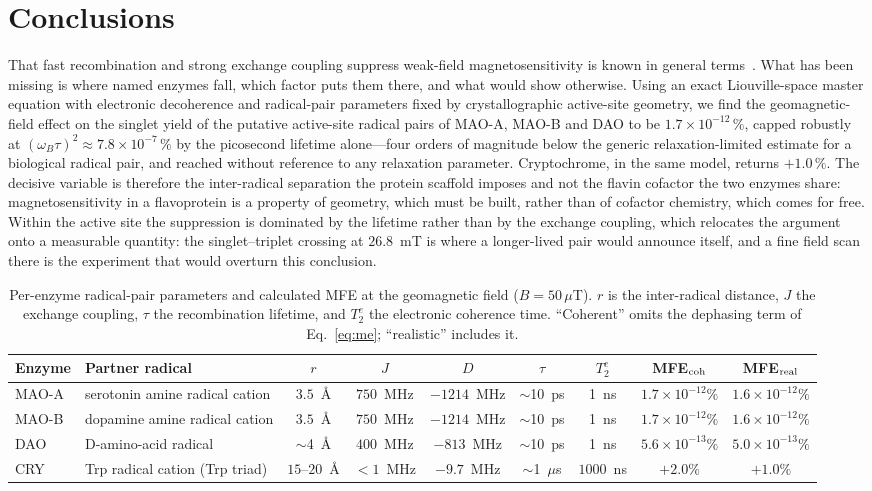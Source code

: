 \documentclass[twoside,twocolumn,9pt]{article}
\begin{document}
\section{Conclusions}

That fast recombination and strong exchange coupling suppress weak-field
magnetosensitivity is known in general terms~\cite{Binhi2025}. What has been
missing is where named enzymes fall, which factor puts them there, and what would
show otherwise. Using an exact Liouville-space master equation with electronic
decoherence and radical-pair parameters fixed by crystallographic active-site
geometry, we find the geomagnetic-field effect on the singlet yield of the
putative active-site radical pairs of MAO-A, MAO-B and DAO to be
$1.7\times10^{-12}\,\%$, capped robustly at $(\omega_B\tau)^2\approx
7.8\times10^{-7}\,\%$ by the picosecond lifetime alone---four orders of magnitude
below the generic relaxation-limited estimate for a biological radical pair, and
reached without reference to any relaxation parameter. Cryptochrome, in the same
model, returns $+1.0\,\%$. The decisive variable is therefore the inter-radical
separation the protein scaffold imposes and not the flavin cofactor the two
enzymes share: magnetosensitivity in a flavoprotein is a property of geometry,
which must be built, rather than of cofactor chemistry, which comes for free.
Within the active site the suppression is dominated by the lifetime rather than
by the exchange coupling, which relocates the argument onto a measurable
quantity: the singlet--triplet crossing at $26.8$~mT is where a longer-lived pair
would announce itself, and a fine field scan there is the experiment that would
overturn this conclusion.

\begin{table}
\centering
\caption{Per-enzyme radical-pair parameters and calculated MFE at the geomagnetic
field ($B = 50\,\mu$T). $r$ is the inter-radical distance, $J$ the exchange
coupling, $\tau$ the recombination lifetime, and $T_2^e$ the electronic coherence
time. ``Coherent'' omits the dephasing term of Eq.~\eqref{eq:me}; ``realistic''
includes it.}
\label{tab:params}
\small
\begin{tabular}{l l c c c c c c c}
\hline
Enzyme & Partner radical & $r$ & $J$ & $D$ & $\tau$ & $T_2^e$
 & MFE$_{\rm coh}$ & MFE$_{\rm real}$ \\
\hline
MAO-A & serotonin amine radical cation & $3.5$~\AA & $750$~MHz & $-1214$~MHz & $\sim$10~ps & 1~ns & $1.7\times10^{-12}\%$ & $1.6\times10^{-12}\%$ \\
MAO-B & dopamine amine radical cation  & $3.5$~\AA & $750$~MHz & $-1214$~MHz & $\sim$10~ps & 1~ns & $1.7\times10^{-12}\%$ & $1.6\times10^{-12}\%$ \\
DAO   & D-amino-acid radical           & $\sim$4~\AA & $400$~MHz & $-813$~MHz & $\sim$10~ps & 1~ns & $5.6\times10^{-13}\%$ & $5.0\times10^{-13}\%$ \\
CRY   & Trp radical cation (Trp triad) & $15$--$20$~\AA & $<1$~MHz & $-9.7$~MHz & $\sim$1~$\mu$s & $1000$~ns & $+2.0\%$ & $+1.0\%$ \\
\hline
\end{tabular}
\end{table}
\end{document}
